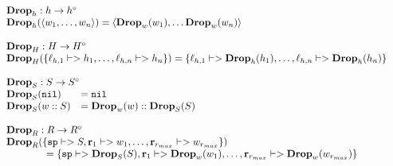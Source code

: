 {\[\begin{array}{l}
\begin{array}{l}
\mathbf{Drop}_h : h -> h^\circ \\
\drop{h}{\langle w_1, \dots, w_n \rangle} = \langle \drop{w}{w_1}, \dots \drop{w}{w_n}\rangle \\\\

\mathbf{Drop}_H : H -> H^\circ \\
\drop{H}{\{\ell_{h,1} |-> h_1, \dots, \ell_{h,n} |-> h_n\}} = \{\ell_{h,1} |-> \drop{h}{h_1}, \dots, \ell_{h,n} |-> \drop{h}{h_n}\}
\end{array} \\\\

\begin{array}{ll}
\rlap{$\mathbf{Drop}_S : S -> S^\circ$} \\
\drop{S}{\mathtt{nil}} &= \mathtt{nil} \\
\drop{S}{w :: S} &= \drop{w}{w} :: \drop{S}{S} \\
\end{array} \\\\

\begin{array}{l}
\mathbf{Drop}_R : R -> R^\circ \\
\drop{R}{\{\mathtt{sp} |-> S, \mathbf{r}_1 |-> w_1, \dots, \mathbf{r}_{r_{max}} |-> w_{r_{max}}\}}\\
\quad\quad\quad\quad = \{\mathtt{sp} |-> \drop{S}{S}, \mathbf{r}_1 |-> \drop{w}{w_1}, \dots, \mathbf{r}_{r_{max}} |-> \drop{w}{w_{r_{max}}}\}
\end{array} \\\\


\end{array}\]}
